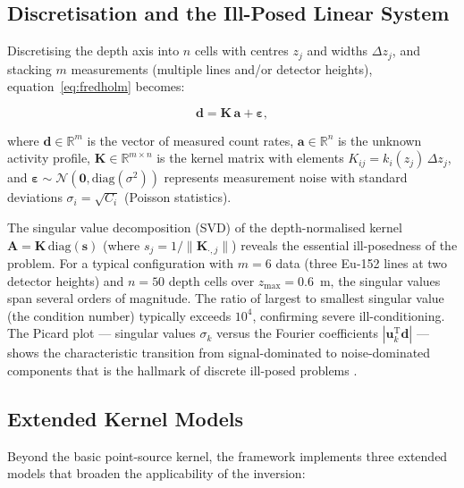 \documentclass[a4paper,11pt]{article}
\newcommand{\R}{\mathbb{R}}
\begin{document}
\subsection{Discretisation and the Ill-Posed Linear System}

Discretising the depth axis into $n$ cells with centres $z_j$ and
widths $\Delta z_j$, and stacking $m$ measurements (multiple lines and/or
detector heights), equation~\eqref{eq:fredholm} becomes:

\begin{equation}\label{eq:linear}
  \bm{d} = \bm{K}\,\bm{a} + \bm{\varepsilon},
\end{equation}

where $\bm{d} \in \R^m$ is the vector of measured count rates,
$\bm{a} \in \R^n$ is the unknown activity profile, $\bm{K} \in \R^{m \times n}$
is the kernel matrix with elements $K_{ij} = k_i(z_j)\,\Delta z_j$, and
$\bm{\varepsilon} \sim \mathcal{N}(\bm{0}, \mathrm{diag}(\sigma^2))$ represents
measurement noise with standard deviations $\sigma_i = \sqrt{C_i}$ (Poisson
statistics).

The singular value decomposition (SVD) of the depth-normalised kernel
$\bm{A} = \bm{K}\,\mathrm{diag}(\bm{s})$ (where $s_j = 1/\|\bm{K}_{\cdot,j}\|$)
reveals the essential ill-posedness of the problem.  For a typical
configuration with $m = 6$ data (three Eu-152 lines at two detector
heights) and $n = 50$ depth cells over $z_{\max} = 0.6$~m, the singular
values span several orders of magnitude.  The ratio of largest to smallest
singular value (the condition number) typically exceeds $10^4$,
confirming severe ill-conditioning.  The Picard plot --- singular values
$\sigma_k$ versus the Fourier coefficients $|\bm{u}_k^\mathrm{T}\bm{d}|$
--- shows the characteristic transition from signal-dominated to
noise-dominated components that is the hallmark of discrete ill-posed
problems \citep{hansen1998rank}.

\subsection{Extended Kernel Models}

Beyond the basic point-source kernel, the framework implements three
extended models that broaden the applicability of the inversion:
\end{document}

